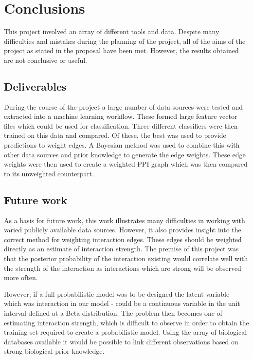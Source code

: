 \chapter{Conclusions}
\label{conclusion}

This project involved an array of different tools and data.
Despite many difficulties and mistakes during the planning of the project, all of the aims of the project as stated in the proposal have been met.
However, the results obtained are not conclusive or useful.


\section{Deliverables}
During the course of the project a large number of data sources were tested and extracted into a machine learning workflow.
These formed large feature vector files which could be used for classification.
Three different classifiers were then trained on this data and compared.
Of these, the best was used to provide predictions to weight edges.
A Bayesian method was used to combine this with other data sources and prior knowledge to generate the edge weights.
These edge weights were then used to create a weighted PPI graph which was then compared to its unweighted counterpart.




\section{Future work}
As a basis for future work, this work illustrates many difficulties in working with varied publicly available data sources.
However, it also provides insight into the correct method for weighting interaction edges.
These edges should be weighted directly as an estimate of interaction strength.
The premise of this project was that the posterior probability of the interaction existing would correlate well with the strength of the interaction as interactions which are strong will be observed more often.

However, if a full probabilistic model was to be designed the latent variable - which was interaction in our model - could be a continuous variable in the unit interval defined at a Beta distribution.
The problem then becomes one of estimating interaction strength, which is difficult to observe in order to obtain the training set required to create a probabilistic model.
Using the array of biological databases available it would be possible to link different observations based on strong biological prior knowledge.

